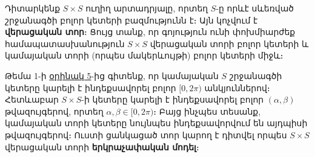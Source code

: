\documentclass[./main.tex]{subfiles}
\begin{document}
\begin{example}\label{ch2ex2}
Դիտարկենք $S\times S$ ուղիղ արտադրյալը, որտեղ $S$-ը
որևէ սևեռված շրջանագծի բոլոր կետերի բազմությունն է։ Այն կոչվում է \textbf{վերացական տոր}։ Ցույց տանք, որ գոյություն ունի փոխմիարժեք համապատասխանություն $S\times S$ վերա\-ցա\-կան տորի բոլոր կետերի և կամայական տորի (որպես մակերևույթի) բոլոր կետերի միջև։%
\par Թեմա 1-ի \hyperref[ch1ex5]{օրինակ 5}-ից գիտենք, որ կամայական $S$ շրջանագծի կետերը կարելի է ինդեքսավորել բոլոր $[0,2\pi)$ անկյուններով։ Հետևաբար $S\times S$-ի կետերը կարելի է ինդեքսավորել բոլոր $(\alpha, \beta )$ թվա\-զույ\-գե\-րով, որտեղ $\alpha ,\beta \in [0,2\pi)$։ Բայց ինչպես տեսանք, կամայական տորի կետերը նույնպես ինդեքսավորվում են այդպիսի թվա\-զույ\-գերով։ Ուստի ցանկացած տոր կարող է դիտվել որպես $S\times S$ վերացական տորի \textbf{երկրաչափական մոդել}։
\end{example}
\end{document}
